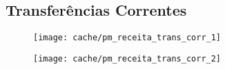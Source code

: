 
\subsection{Transferências Correntes}





\begin{figure}[H]
\center
\texttt{[image: cache/pm\_receita\_trans\_corr\_1]}
\end{figure}

\begin{figure}[H]
\center
\texttt{[image: cache/pm\_receita\_trans\_corr\_2]}
\end{figure}
